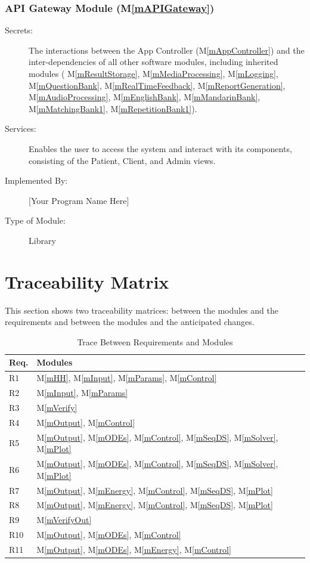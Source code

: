 \documentclass[12pt, titlepage]{article}
\newcommand{\mref}[1]{M\ref{#1}}
\begin{document}
  \subsubsection{API Gateway Module (\mref{mAPIGateway})}

  \begin{description}
    \item[Secrets:]The interactions between the App Controller (\mref{mAppController}) and the inter-dependencies of all other software modules, including inherited modules (
    \mref{mResultStorage},
    \mref{mMediaProcessing},
    \mref{mLogging},
    \mref{mQuestionBank},
    \mref{mRealTimeFeedback},
    \mref{mReportGeneration},
    \mref{mAudioProcessing},
    \mref{mEnglishBank},
    \mref{mMandarinBank},
    \mref{mMatchingBank1},
    \mref{mRepetitionBank1}).
    \item[Services:]Enables the user to access the system and interact with its components, consisting of the Patient, Client, and Admin views.
    \item[Implemented By:] [Your Program Name Here]
    \item[Type of Module:] Library
    \end{description}

\section{Traceability Matrix} \label{SecTM}

This section shows two traceability matrices: between the modules and the
requirements and between the modules and the anticipated changes.

\begin{table}[H]
\centering
\begin{tabular}{p{} p{}}
\toprule
\textbf{Req.} & \textbf{Modules}\\
\midrule
R1 & \mref{mHH}, \mref{mInput}, \mref{mParams}, \mref{mControl}\\
R2 & \mref{mInput}, \mref{mParams}\\
R3 & \mref{mVerify}\\
R4 & \mref{mOutput}, \mref{mControl}\\
R5 & \mref{mOutput}, \mref{mODEs}, \mref{mControl}, \mref{mSeqDS}, \mref{mSolver}, \mref{mPlot}\\
R6 & \mref{mOutput}, \mref{mODEs}, \mref{mControl}, \mref{mSeqDS}, \mref{mSolver}, \mref{mPlot}\\
R7 & \mref{mOutput}, \mref{mEnergy}, \mref{mControl}, \mref{mSeqDS}, \mref{mPlot}\\
R8 & \mref{mOutput}, \mref{mEnergy}, \mref{mControl}, \mref{mSeqDS}, \mref{mPlot}\\
R9 & \mref{mVerifyOut}\\
R10 & \mref{mOutput}, \mref{mODEs}, \mref{mControl}\\
R11 & \mref{mOutput}, \mref{mODEs}, \mref{mEnergy}, \mref{mControl}\\
\bottomrule
\end{tabular}
\caption{Trace Between Requirements and Modules}
\label{TblRT}
\end{table}
\end{document}
